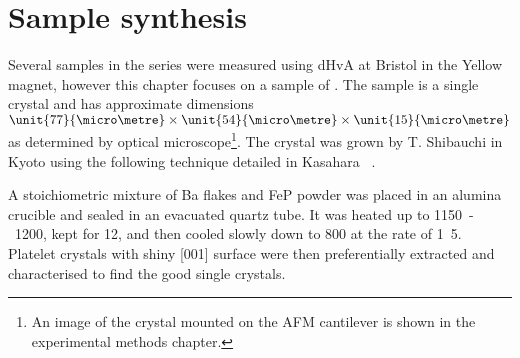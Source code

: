 \section{Sample synthesis}

Several samples in the \BaFeAsP{} series were measured using \ac{dHvA} at Bristol in the Yellow magnet, however this chapter focuses on a sample of \BaFeP. The sample is a single crystal and has approximate dimensions $\unit{77}{\micro\metre}\times\unit{54}{\micro\metre}\times \unit{15}{\micro\metre}$ as determined by optical microscope\footnote{An image of the crystal mounted on the \ac{AFM} cantilever is shown in the experimental methods chapter.}. The crystal was grown by T. Shibauchi in Kyoto using the following technique detailed in Kasahara \etal~\cite{Kasahara2010}. 

A stoichiometric mixture of Ba flakes and FeP powder was placed in an alumina crucible and sealed in an evacuated quartz tube. It was heated up to \unit{1150-1200}{\celsius}, kept for \unit{12}{\hour}, and then cooled slowly down to \unit{800}{\celsius} at the rate of \unit{1.5}{\celsius\per\hour}. Platelet crystals with shiny [001] surface were then preferentially extracted and characterised to find the good single crystals.

